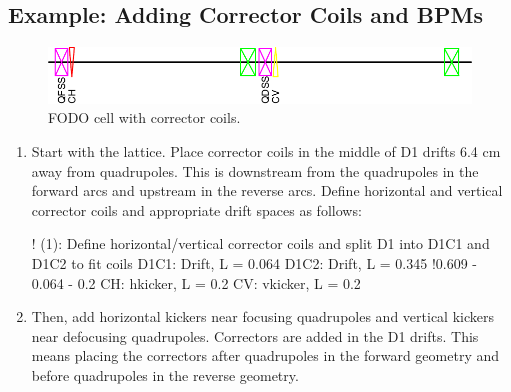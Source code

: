 \documentclass{hitec}     %
\begin{document}
{{{{\subsection{Example: Adding Corrector Coils and BPMs}

\begin{figure}[!h]
  \centering
  \includegraphics[width=0.9\linewidth]{figures/correctors.pdf}
  \caption{FODO cell with corrector coils.}
  \label{f:corrector}
\end{figure}

\begin{enumerate}[leftmargin=*]
\item Start with the  lattice. Place corrector coils in the middle of D1 drifts 6.4 cm away from quadrupoles. This is downstream from the quadrupoles in the forward arcs and upstream in the reverse arcs. Define horizontal and vertical corrector coils and appropriate drift spaces as follows:
\begin{code}
! (1): Define horizontal/vertical corrector coils and 
        split D1 into D1C1 and D1C2 to fit coils
D1C1: Drift, L = 0.064
D1C2: Drift, L = 0.345 !0.609 - 0.064 - 0.2
CH: hkicker, L = 0.2
CV: vkicker, L = 0.2
\end{code}
\item Then, add horizontal kickers near focusing quadrupoles and vertical kickers near defocusing quadrupoles. Correctors are added in the D1 drifts. This means placing the correctors after quadrupoles in the forward geometry and before quadrupoles in the reverse geometry. 


\end{enumerate}}}}}
\end{document}
